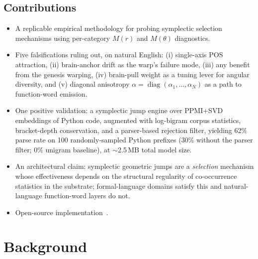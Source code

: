 \documentclass[11pt,a4paper]{article}
\begin{document}
\subsection{Contributions}
\begin{itemize}
\item A replicable empirical methodology for probing symplectic selection mechanisms using per-category $M(r)$ and $M(\theta)$ diagnostics.
\item Five falsifications ruling out, on natural English: (i) single-axis POS attraction, (ii) brain-anchor drift as the warp's failure mode, (iii) any benefit from the genesis warping, (iv) brain-pull weight as a tuning lever for angular diversity, and (v) diagonal anisotropy $\alpha = \operatorname{diag}(\alpha_1, \ldots, \alpha_N)$ as a path to function-word emission.
\item One positive validation: a symplectic jump engine over PPMI+SVD embeddings of Python code, augmented with log-bigram corpus statistics, bracket-depth conservation, and a parser-based rejection filter, yielding 62\% parse rate on 100 randomly-sampled Python prefixes (30\% without the parser filter; 0\% unigram baseline), at $\sim$2.5\,MB total model size.
\item An architectural claim: symplectic geometric jumps are a \emph{selection} mechanism whose effectiveness depends on the structural regularity of co-occurrence statistics in the substrate; formal-language domains satisfy this and natural-language function-word layers do not.
\item Open-source implementation~\cite{github}.
\end{itemize}

\section{Background}\label{sec:background}
\end{document}
